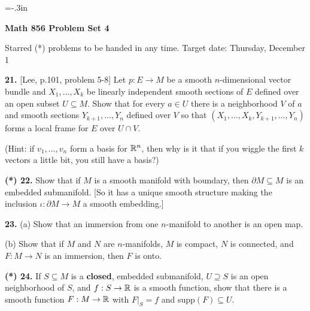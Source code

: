 
\nopagenumbers

\vsize=10in
\voffset=-.3in


\loadmsbm

\def\ctln{\centerline}
\def\ssk{\smallskip}
\def\msk{\medskip}
\def\bsk{\bigskip}
\def\nidt{\noindent}
\def\del{\partial}
\def\bbr{{\Bbb R}}
\def\cla{{\Cal A}}
\def\clb{{\Cal B}}
\def\clc{{\Cal C}}
\def\ra{\rightarrow}
\def\lra{$\Leftrightarrow$}

\ctln{\bf Math 856 Problem Set 4}

\ssk

\ctln{Starred (*) problems to be handed in any time. Target date: Thursday, December 1}

\bsk

\item{\bf 21.} [Lee, p.101, problem 5-8] Let $p:E\ra M$ be a smooth $n$-dimensional 
vector bundle and 
$X_1,\ldots ,X_k$ be linearly independent smooth sections of $E$ defined over an open 
subset $U\subseteq M$.
Show that for every $a\in U$ there is a neighborhood $V$ of $a$ and smooth sections
$Y_{k+1},\ldots ,Y_n$ defined over $V$ so that $(X_1,\ldots ,X_k,Y_{k+1},\ldots ,Y_n)$
forms a local frame for $E$ over $U\cap V$. 

\ssk

\item{} (Hint: if $v_1,\ldots ,v_n$ form a basis for $\bbr^n$, then why is it that if you wiggle 
the first $k$ vectors a little bit, you still have a basis?)
\msk

\msk

\item{\bf (*) 22.} Show that if $M$ is a smooth manifold with boundary, then $\del M\subseteq M$
is an embedded submanifold. [So it has a unique smooth structure making the inclusion 
$\iota:\del M\rightarrow M$ a smooth embedding.]

\msk

\item{\bf 23.} (a) Show that an immersion from one $n$-manifold to another is an open map.

\ssk

\item{} (b) Show that if $M$ and $N$ are $n$-manifolds, $M$ is compact, $N$ is connected, and
$F:M\ra N$ is an immersion, then $F$ is onto.

\msk

\item{\bf (*) 24.} If $S\subseteq M$ is a {\bf closed}, embedded submanifold, $U\supseteq S$
is an open neighborhood of $S$, and 
$f:S\ra \bbr$ is a smooth function, show that there is a smooth function
$F:M\ra \bbr$ with $F|_S=f$ and supp$(F)\subseteq U$.

